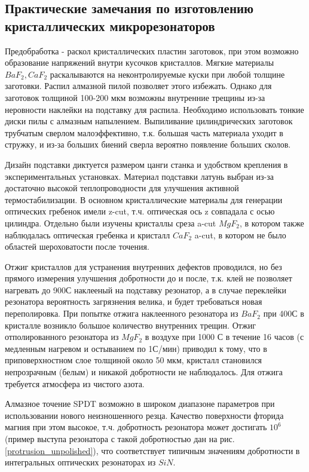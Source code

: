 \subsection{Практические замечания по изготовлению кристаллических микрорезонаторов}

Предобработка - раскол кристаллических пластин заготовок, при этом возможно образование напряжений внутри кусочков кристаллов. Мягкие материалы $BaF_2, CaF_2$ раскалываются на неконтролируемые куски при любой толщине заготовки. Распил алмазной пилой позволяет этого избежать. Однако для заготовок толщиной 100-200 мкм возможны внутренние трещины из-за неровности наклейки на подставку для распила. Необходимо использовать тонкие диски пилы с алмазным напылением. Выпиливание цилиндрических заготовок трубчатым сверлом малоэффективно, т.к. большая часть материала уходит в стружку, и из-за больших биений сверла вероятно появление больших сколов.

Дизайн подставки диктуется размером цанги станка и удобством крепления в экспериментальных установках. Материал подставки латунь выбран из-за достаточно высокой теплопроводности для улучшения активной термостабилизации. В основном кристаллические материалы для генерации оптических гребенок имели z-cut, т.ч. оптическая ось z совпадала с осью цилиндра. Отдельно были изучены кристаллы среза a-cut $MgF_2$, в котором также наблюдалась оптическая гребенка и кристалл $CaF_2$ a-cut, в котором не было областей шероховатости после точения.

Отжиг кристаллов для устранения внутренних дефектов проводился, но без прямого измерения улучшения добротности до и после, т.к. клей не позволяет нагревать до 900С наклееный на подставку резонатор, а в случае переклейки резонатора вероятность загрязнения велика, и будет требоваться новая переполировка. При попытке отжига наклеенного резонатора из $BaF_2$ при 400С в кристалле возникло большое количество внутренних трещин. Отжиг отполированного резонатора из $MgF_2$ в воздухе при 1000 С в течение 16 часов (с медленным нагревом и остыванием по 1С/мин) приводил к тому, что в приповерхностном слое толщиной около 50 мкм, кристалл становился непрозрачным (белым) и никакой добротности не наблюдалось. Для отжига требуется атмосфера из чистого азота.

Алмазное точение SPDT возможно в широком диапазоне параметров при использовании нового неизношенного резца. Качество поверхности фторида магния при этом высокое, т.ч. добротность резонатора может достигать $10^6$ (пример выступа резонатора с такой добротностью дан на рис. \ref{protrusion_unpolished}), что соответствует типичным значениям добротности в интегральных оптических резонаторах из $SiN$.

